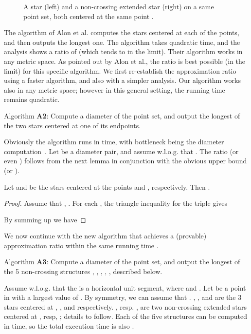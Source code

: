 \documentclass[proceedings]{stacs}
\begin{document}
\begin{figure} [htbp]
\centerline{\epsfxsize=3.3in }
\caption{\small A star (left) and a non-crossing extended star (right)
on a same point set, both centered at the same point .}
\label{f2}
\end{figure}


The algorithm of Alon et al. computes the  stars centered at each
of the points, and then outputs the longest one. The algorithm takes
quadratic time, and the analysis shows a ratio of 
(which tends to  in the limit). Their algorithm works in any
metric space. As pointed out by Alon et al., the ratio  is best
possible (in the limit) for this specific algorithm.
We first re-establish the  approximation ratio using a faster
algorithm, and also with a simpler analysis. Our algorithm
works also in any  metric space; however in this general setting, the
running time remains quadratic.


\smallskip
\noindent Algorithm {\bf A2}: Compute a diameter of the point
set, and output the longest of the two stars centered at one of its endpoints.

\smallskip
Obviously the algorithm runs in  time, with bottleneck
being the diameter computation~\cite{PS85}.
Let  be a diameter pair, and assume w.l.o.g. that .
The ratio  (or even )
follows from the next lemma in conjunction with the obvious upper
bound  (or ).

\begin{lemma} \label{L3}
Let  and   be the stars centered at the points  and ,
respectively. Then .
\end{lemma}
\begin{proof}
Assume that , . For each , the triangle inequality
for the triple  gives

By summing up we have


\vspace{-1.5\baselineskip}
\end{proof}

We now continue with the new algorithm that achieves a (provable)
 approximation ratio within the same
running time .


\smallskip
\noindent Algorithm {\bf A3}: Compute a diameter  of the point
set, and output the longest of the 5 non-crossing structures
, , , , , described below.

\smallskip
Assume w.l.o.g. that the  is a horizontal unit segment, where
 and .
Let  be a point in  with a largest value of .
By symmetry, we can assume that .
, , and  are the 3 stars centered at , , and
 respectively. , resp. , are two non-crossing
extended stars centered at , resp, ; details to follow.
Each of the five structures can be computed in 
time, so the total execution time is also .
\end{document}

